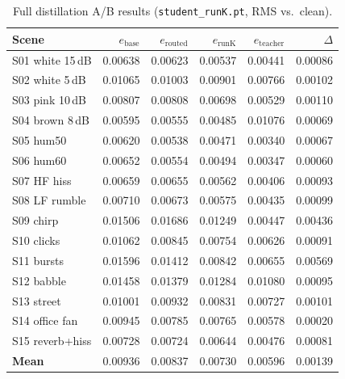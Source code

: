 \begin{table}[H]
  \centering
  \caption{Full distillation A/B results (\texttt{student\_runK.pt}, RMS vs.\ clean).}
  \label{tab:distill_full}
  \footnotesize
  \setlength{\tabcolsep}{3pt}
  \begin{tabular}{lrrrrr}
    \toprule
    \textbf{Scene} & $e_{\mathrm{base}}$ & $e_{\mathrm{routed}}$ & $e_{\mathrm{runK}}$ & $e_{\mathrm{teacher}}$ & $\Delta$ \\
    \midrule
    S01 white 15\,dB  & 0.00638 & 0.00623 & 0.00537 & 0.00441 & 0.00086 \\
    S02 white 5\,dB   & 0.01065 & 0.01003 & 0.00901 & 0.00766 & 0.00102 \\
    S03 pink 10\,dB   & 0.00807 & 0.00808 & 0.00698 & 0.00529 & 0.00110 \\
    S04 brown 8\,dB   & 0.00595 & 0.00555 & 0.00485 & 0.01076 & 0.00069 \\
    S05 hum50         & 0.00620 & 0.00538 & 0.00471 & 0.00340 & 0.00067 \\
    S06 hum60         & 0.00652 & 0.00554 & 0.00494 & 0.00347 & 0.00060 \\
    S07 HF hiss       & 0.00659 & 0.00655 & 0.00562 & 0.00406 & 0.00093 \\
    S08 LF rumble     & 0.00710 & 0.00673 & 0.00575 & 0.00435 & 0.00099 \\
    S09 chirp         & 0.01506 & 0.01686 & 0.01249 & 0.00447 & 0.00436 \\
    S10 clicks        & 0.01062 & 0.00845 & 0.00754 & 0.00626 & 0.00091 \\
    S11 bursts        & 0.01596 & 0.01412 & 0.00842 & 0.00655 & 0.00569 \\
    S12 babble        & 0.01458 & 0.01379 & 0.01284 & 0.01080 & 0.00095 \\
    S13 street        & 0.01001 & 0.00932 & 0.00831 & 0.00727 & 0.00101 \\
    S14 office fan    & 0.00945 & 0.00785 & 0.00765 & 0.00578 & 0.00020 \\
    S15 reverb+hiss   & 0.00728 & 0.00724 & 0.00644 & 0.00476 & 0.00081 \\
    \midrule
    \textbf{Mean}     & 0.00936 & 0.00837 & 0.00730 & 0.00596 & 0.00139 \\
    \bottomrule
  \end{tabular}
\end{table}

